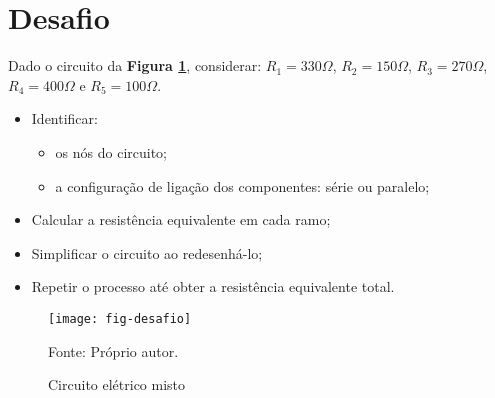 \section{Desafio}

\begin{minipage}{\linewidth}
  \centering
  \begin{minipage}{0.45\linewidth}
    Dado o circuito da \textbf{Figura \ref{fig:CircuitoDesafio}},
    considerar: $R_1 = 330\Omega$,
                $R_2 = 150\Omega$,
                $R_3 = 270\Omega$, \\
                $R_4 = 400\Omega$ e
                $R_5 = 100\Omega$.
    \begin{itemize}
      \item Identificar:
      \begin{itemize}
        \item os nós do circuito;
        \item a configuração de ligação dos componentes: série ou paralelo;
      \end{itemize}
      \item Calcular a resistência equivalente em cada ramo;
      \item Simplificar o circuito ao redesenhá-lo;
      \item Repetir o processo até obter a resistência equivalente total.
    \end{itemize}
  \end{minipage}
  \hspace{0.05\linewidth}
  \begin{minipage}{0.45\linewidth}
    \begin{figure}[H]
      \centering
      \caption{Circuito elétrico misto}
      \label{fig:CircuitoDesafio}
      \texttt{[image: fig-desafio]}

      {\small Fonte: Próprio autor.}
    \end{figure}
  \end{minipage}
\end{minipage}

